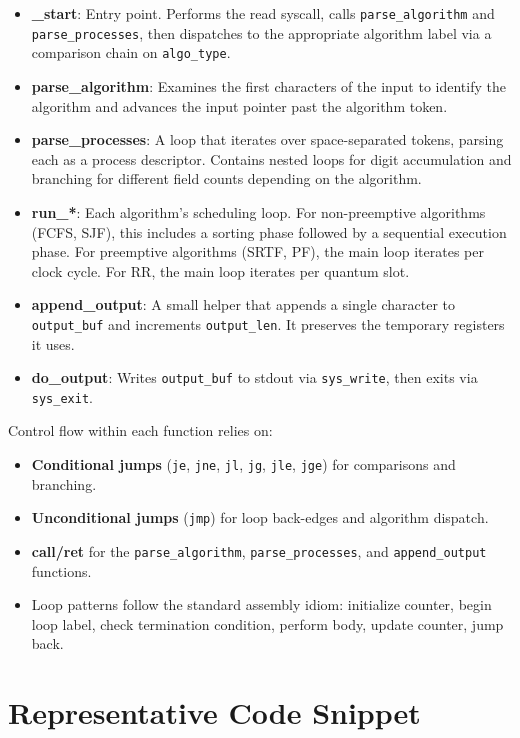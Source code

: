\documentclass[a4paper,12pt]{article}
\begin{document}
\begin{itemize}
    \item \textbf{\_start}: Entry point. Performs the read syscall, calls \texttt{parse\_algorithm} and \texttt{parse\_processes}, then dispatches to the appropriate algorithm label via a comparison chain on \texttt{algo\_type}.
    \item \textbf{parse\_algorithm}: Examines the first characters of the input to identify the algorithm and advances the input pointer past the algorithm token.
    \item \textbf{parse\_processes}: A loop that iterates over space-separated tokens, parsing each as a process descriptor. Contains nested loops for digit accumulation and branching for different field counts depending on the algorithm.
    \item \textbf{run\_*}: Each algorithm's scheduling loop. For non-preemptive algorithms (FCFS, SJF), this includes a sorting phase followed by a sequential execution phase. For preemptive algorithms (SRTF, PF), the main loop iterates per clock cycle. For RR, the main loop iterates per quantum slot.
    \item \textbf{append\_output}: A small helper that appends a single character to \texttt{output\_buf} and increments \texttt{output\_len}. It preserves the temporary registers it uses.
    \item \textbf{do\_output}: Writes \texttt{output\_buf} to stdout via \texttt{sys\_write}, then exits via \texttt{sys\_exit}.
\end{itemize}

Control flow within each function relies on:
\begin{itemize}
    \item \textbf{Conditional jumps} (\texttt{je}, \texttt{jne}, \texttt{jl}, \texttt{jg}, \texttt{jle}, \texttt{jge}) for comparisons and branching.
    \item \textbf{Unconditional jumps} (\texttt{jmp}) for loop back-edges and algorithm dispatch.
    \item \textbf{call/ret} for the \texttt{parse\_algorithm}, \texttt{parse\_processes}, and \texttt{append\_output} functions.
    \item Loop patterns follow the standard assembly idiom: initialize counter, begin loop label, check termination condition, perform body, update counter, jump back.
\end{itemize}


\section{Representative Code Snippet}
\end{document}
